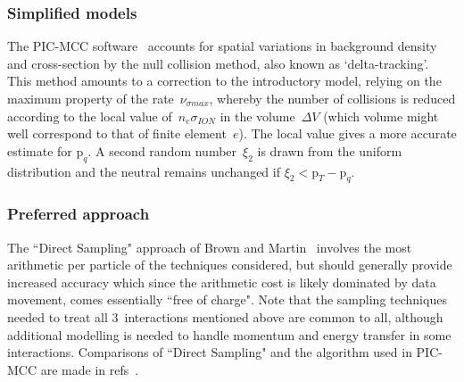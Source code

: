 \subsubsection{Simplified models}\label{sec:33nasimp}
The PIC-MCC software~\cite{Ve05Part} accounts for spatial variations in
background density and cross-section by the null collision method,
also known as `delta-tracking'. This method amounts
to a correction to the introductory model, relying on the maximum property of
the rate~$\nu_{\sigma max}$, whereby the number of collisions is reduced according to
the local value of~$n_e \sigma_{ION}$ in the volume~$\Delta V$ (which volume might well
correspond to that of finite element~$e$). The local value gives a more accurate
estimate for $\mathrm{p}_q$. A second random number~$\xi_2$ is drawn from the uniform
distribution and the neutral remains unchanged if  $\xi_2< \mathrm{p}_T-\mathrm{p}_q$.

\subsubsection{Preferred approach}\label{sec:33naprefer}
The ``Direct Sampling" approach of Brown and Martin~\cite{Br03Dire}
involves the most arithmetic per particle of the
techniques considered, but should generally provide increased accuracy which since the
arithmetic cost is likely dominated by data movement, comes essentially ``free of charge".
Note that the sampling techniques needed to treat all $3$~interactions mentioned above are
common to all, although additional modelling is needed to handle momentum
and energy transfer in some interactions. Comparisons of ``Direct Sampling"
and the algorithm used in PIC-MCC are made in refs~\cite{Li11Rese,Be20Revi}.

